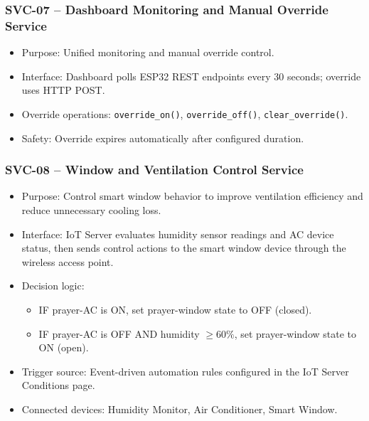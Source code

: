 \subsubsection*{SVC-07 -- Dashboard Monitoring and Manual Override Service}
\begin{itemize}
  \item Purpose: Unified monitoring and manual override control.
  \item Interface: Dashboard polls ESP32 REST endpoints every 30 seconds; override uses HTTP POST.
  \item Override operations: \texttt{override\_on()}, \texttt{override\_off()}, \texttt{clear\_override()}.
  \item Safety: Override expires automatically after configured duration.
\end{itemize}

\subsubsection*{SVC-08 -- Window and Ventilation Control Service}
\begin{itemize}
  \item Purpose: Control smart window behavior to improve ventilation efficiency and reduce unnecessary cooling loss.
  \item Interface: IoT Server evaluates humidity sensor readings and AC device status, then sends control actions to the smart window device through the wireless access point.
  \item Decision logic:
  \begin{itemize}
    \item IF prayer-AC is ON, set prayer-window state to OFF (closed).
    \item IF prayer-AC is OFF AND humidity $\geq 60\%$, set prayer-window state to ON (open).
  \end{itemize}
  \item Trigger source: Event-driven automation rules configured in the IoT Server Conditions page.
  \item Connected devices: Humidity Monitor, Air Conditioner, Smart Window.
\end{itemize}

